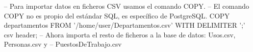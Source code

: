 \lstset{caption=Ejemplo de COPY,label=sql:copy}
\begin{SQL}
-- Para importar datos en ficheros CSV usamos el comando COPY.
-- El comando COPY no es propio del estándar SQL, es específico de PostgreSQL.
COPY departamentos FROM '/home/user/Departamentos.csv' WITH DELIMITER ';' csv header;
-- Ahora importa el resto de ficheros a la base de datos: Usos.csv, Personas.csv y
-- PuestosDeTrabajo.csv
\end{SQL}
